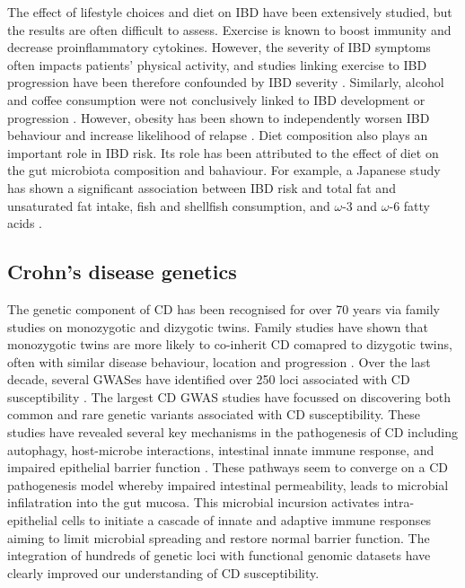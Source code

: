 The effect of lifestyle choices and diet on IBD have been extensively studied, but the results are often difficult to assess. Exercise is known to boost immunity and decrease proinflammatory cytokines. However, the severity of IBD symptoms often impacts patients' physical activity, and studies linking exercise to IBD progression have been therefore confounded by IBD severity \cite{Rozich2020-ui}. Similarly, alcohol and coffee consumption were not conclusively linked to IBD development or progression \cite{Yang2019-gt}. However, obesity has been shown to independently worsen IBD behaviour and increase likelihood of relapse \cite{Jain2019-oy}. Diet composition also plays an important role in IBD risk. Its role has been attributed to the effect of diet on the gut microbiota composition and bahaviour. For example, a Japanese study has shown a significant association between IBD risk and total fat and unsaturated fat intake, fish and shellfish consumption, and $\omega$-3 and $\omega$-6 fatty acids \cite{Reif1997-li}.\\



\subsection{Crohn's disease genetics}
The genetic component of CD has been recognised for over 70 years via family studies on monozygotic and dizygotic twins. Family studies have shown that monozygotic twins are more likely to co-inherit CD comapred to dizygotic twins, often with similar disease behaviour, location and progression \cite{Ng2012-mf}. Over the last decade, several GWASes have identified over 250 loci associated with CD susceptibility \cite{Jostins2012-ig,De_Lange2017-re,Liu2015-bx,Luo2017-kx}. The largest CD GWAS studies have focussed on discovering both common and rare genetic variants associated with CD susceptibility. These studies have revealed several key mechanisms in the pathogenesis of CD including autophagy, host-microbe interactions, intestinal innate immune response, and impaired epithelial barrier function \cite{Khor2011-td,Jostins2012-ig}. These pathways seem to converge on a CD pathogenesis model whereby impaired intestinal permeability, leads to microbial infilatration into the gut mucosa. This microbial incursion activates intra-epithelial cells to initiate a cascade of innate and adaptive immune responses aiming to limit microbial spreading and restore normal barrier function. The integration of hundreds of genetic loci with functional genomic datasets have clearly improved our understanding of CD susceptibility. \\

